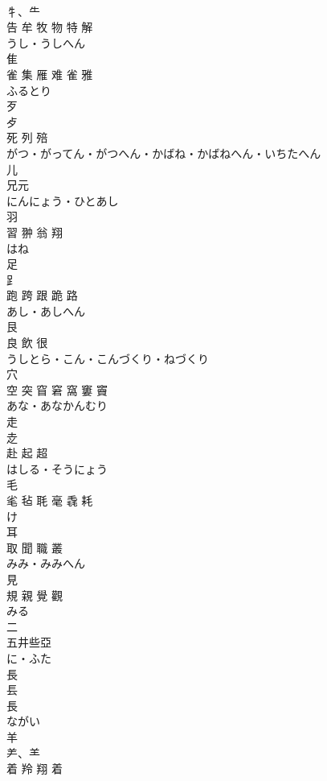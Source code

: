 \documentclass[8pt]{extreport}
\begin{document}
\begin{CJK}{UTF8}{min}
\\	牜、⺧ 
\\	告 牟 牧 物 特 解	
\\	うし・うしへん	
\\	隹	
\\	雀 集 雁 难 雀 雅	
\\	ふるとり	
\\	歹	
\\	歺 
\\	死 列 殕	
\\	がつ・がってん・がつへん・かばね・かばねへん・いちたへん	
\\	儿	
\\	兄元	
\\	にんにょう・ひとあし	
\\	羽	
\\	習 翀 翁 翔	
\\	はね	
\\	足	
\\	⻊ 
\\	跑 跨 跟 跪 路	
\\	あし・あしへん	
\\	艮	
\\	良 飲 很	
\\	うしとら・こん・こんづくり・ねづくり	
\\	穴	
\\	空 突 窅 窘 窩 窶 竇	
\\	あな・あなかんむり	
\\	走	
\\	赱 
\\	赴 起 超	
\\	はしる・そうにょう	
\\	毛	
\\	毟 毡 毦 毫 毳 耗	
\\	け	
\\	耳	
\\	取 聞 職 叢	
\\	みみ・みみへん	
\\	見	
\\	規 親 覺 觀	
\\	みる	
\\	二	
\\	五井些亞	
\\	に・ふた	
\\	長	
\\	镸 
\\	長	
\\	ながい	
\\	羊	
\\	⺶、⺷ 
\\	着 羚 翔 着	

\end{CJK}
\end{document}
